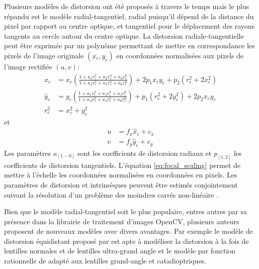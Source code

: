 Plusieurs modèles de distorsion ont été proposés à travers le temps mais le plus répandu est le modèle radial-tangentiel, radial puisqu'il dépend de la distance du pixel par rapport au centre optique, et tangentiel pour le déplacement des rayons tangents au cercle autour du centre optique. La distorsion radiale-tangentielle peut être exprimée par un polynôme permettant de mettre en correspondance les pixels de l'image originale $(x_c, y_c)$ en coordonnées normalisées aux pixels de l'image rectifiée $(u, v)$:
\begin{equation}
  \begin{aligned}
    \hat{x}_c &= x_c\left(\frac{1 + \kappa_1r_c^2 + \kappa_2r_c^4 + \kappa_3r_c^6}{1 + \kappa_4r_c^2 + \kappa_5r_c^4 + \kappa_6r_c^6}\right) + 2p_1 x_c y_c + p_2(r_c^2 + 2 x_c^2) \\
    \hat{y}_c &= y_c\left(\frac{1 + \kappa_1r_c^2 + \kappa_2r_c^4 + \kappa_3r_c^6}{1 + \kappa_4r_c^2 + \kappa_5r_c^4 + \kappa_6r_c^6}\right) + p_1 (r_c^2 + 2 y_c^2) + 2p_2 x_c y_c \\
    r_c^2     &= x_c^2 + y_c^2
    \label{eq:rectification}
  \end{aligned}
\end{equation}
et
\begin{equation}
  \begin{aligned}
    u & = f_x \hat{x}_c + c_x\\
    v &= f_y \hat{y}_c + c_y
    \label{eq:focal_scaling}
  \end{aligned}
\end{equation}
Les paramètres $\kappa_{[1-6]}$ sont les coefficients de distorsion radiaux et $p_{[1,2]}$ les coefficients de distorsion tangentiels. L'équation \ref{eq:focal_scaling} permet de mettre à l'échelle les coordonnées normalisées en coordonnées en pixels. Les paramètres de distorsion et intrinsèques peuvent être estimés conjointement suivant la résolution d'un problème des moindres carrés non-linéaire \citep{Zhang2000}.

Bien que le modèle radial-tangentiel soit le plus populaire, entres autres par sa présence dans la librairie de traitement d'images OpenCV, plusieurs auteurs proposent de nouveaux modèles avec divers avantages. Par exemple le modèle de distorsion équidistant proposé par \cite{Kannala2006} est apte à modéliser la distorsion à la fois de lentilles normales et de lentilles ultra-grand angle et le modèle par fonction rationnelle de \cite{Claus2005} adapté aux lentilles grand-angle et catadioptriques.

